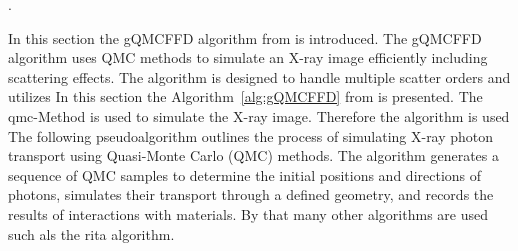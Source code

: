 \pagebreak
.


In this section the gQMCFFD algorithm from \cite{qmcXray2023} is introduced. The gQMCFFD algorithm uses QMC methods to simulate an X-ray image efficiently including scattering effects. The algorithm is designed to handle multiple scatter orders and utilizes 
In this section the Algorithm~\ref{alg:gQMCFFD} from \cite{qmcXray2023} is presented. The \ac{qmc}-Method is used to simulate the X-ray image. Therefore the algorithm is used 
The following pseudoalgorithm outlines the process of simulating X-ray photon transport using Quasi-Monte Carlo (QMC) methods. The algorithm generates a sequence of QMC samples to determine the initial positions and directions of photons, simulates their transport through a defined geometry, and records the results of interactions with materials. By that many other algorithms are used such als the \ac{rita} algorithm.

